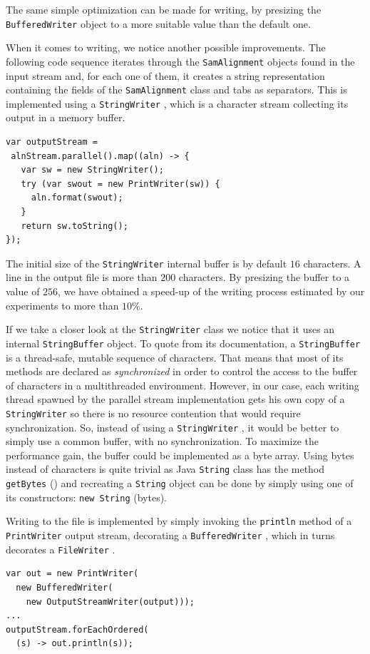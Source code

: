 \documentclass[a4paper,twoside]{article}
\begin{document}
The same simple optimization can be made for writing, by presizing the {\texttt{BufferedWriter} } object to a more suitable value than the default one.

When it comes to writing, we notice another possible improvements.
The following code sequence iterates through the {\texttt{SamAlignment} } objects found in the input stream and, for each one of them, it creates a string representation containing the fields of the  {\texttt{SamAlignment} } class and tabs as separators.
This is implemented using a {\texttt{StringWriter} }, which is a character stream collecting its output in a memory buffer.
\begin{verbatim}
var outputStream = 
 alnStream.parallel().map((aln) -> {
   var sw = new StringWriter();
   try (var swout = new PrintWriter(sw)) {
     aln.format(swout);
   }
   return sw.toString();
});
\end{verbatim}

The initial size of the {\texttt{StringWriter} } internal buffer is by default $16$ characters.
A line in the output file is more than $200$ characters.
By presizing the buffer to a value of $256$, we have obtained a speed-up of the writing process estimated by our experiments to more than $10\%$.

If we take a closer look at the {\texttt{StringWriter} } class we notice that it uses an internal {\texttt{StringBuffer} } object.
To quote from its documentation, a {\texttt{StringBuffer} } is  a thread-safe, mutable sequence of characters.
That means that most of its methods are declared as {\textit{synchronized} } in order to control the access to the buffer of characters in a multithreaded environment.
However, in our case, each writing thread spawned by the parallel stream implementation gets his own copy of a {\texttt{StringWriter} } so there is no resource contention that would require synchronization.
So, instead of using a {\texttt{StringWriter} }, it would be better to simply use a common buffer, with no synchronization.
To maximize the performance gain, the buffer could be implemented as a byte array.
Using bytes instead of characters is quite trivial as Java {\texttt{String} } class has the method {\texttt{getBytes} ()} and recreating a {\texttt{String} } object can be done by simply using one of its constructors: {\texttt{new String} (bytes)}.

Writing to the file is implemented by simply invoking the {\texttt{println} } method of a {\texttt{PrintWriter} } output stream, decorating a {\texttt{BufferedWriter} }, which in turns decorates a {\texttt{FileWriter} }.
\begin{verbatim}
var out = new PrintWriter(
  new BufferedWriter(
    new OutputStreamWriter(output)));
...    
outputStream.forEachOrdered(
  (s) -> out.println(s));
\end{verbatim}
\end{document}
